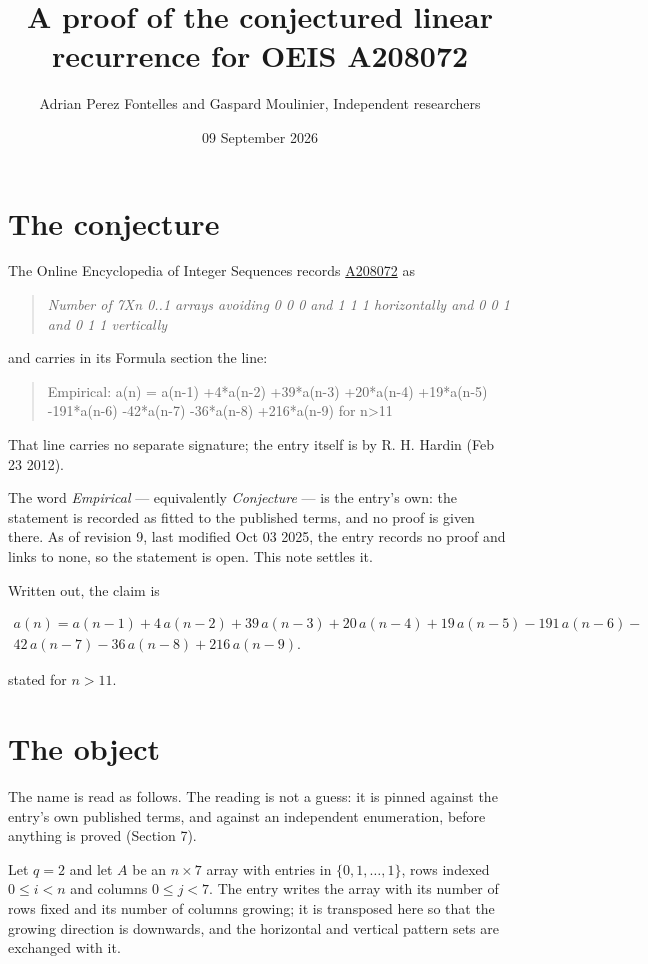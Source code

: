 \documentclass[11pt]{article}
\title{A proof of the conjectured linear recurrence for OEIS A208072}
\author{Adrian Perez Fontelles and Gaspard Moulinier, Independent researchers}
\date{09 September 2026}
\theoremstyle{definition}
\begin{document}
\maketitle
\section{The conjecture}

The Online Encyclopedia of Integer Sequences records \href{https://oeis.org/A208072}{A208072} as

\begin{quote}\itshape Number of 7Xn 0..1 arrays avoiding 0 0 0 and 1 1 1 horizontally and 0 0 1 and 0 1 1 vertically\end{quote}

and carries in its Formula section the line:

\begin{quote}\ttfamily Empirical: a(n) = a(n-1) +4*a(n-2) +39*a(n-3) +20*a(n-4) +19*a(n-5) -191*a(n-6) -42*a(n-7) -36*a(n-8) +216*a(n-9) for n>11\end{quote}

That line carries no separate signature; the entry itself is by R. H. Hardin (Feb 23 2012).

The word {\itshape Empirical} --- equivalently {\itshape Conjecture} --- is the entry's own: the statement is recorded as fitted to the published terms, and no proof is given there. As of revision 9, last modified Oct 03 2025, the entry records no proof and links to none, so the statement is open. This note settles it.

Written out, the claim is

\begin{multline*} a(n) = a(n-1) + 4\,a(n-2) + 39\,a(n-3) + 20\,a(n-4) + 19\,a(n-5) - 191\,a(n-6) - \\ 42\,a(n-7) - 36\,a(n-8) + 216\,a(n-9). \end{multline*}

stated for $n > 11$.

\section{The object}

The name is read as follows. The reading is not a guess: it is pinned against the entry's own published terms, and against an independent enumeration, before anything is proved (Section 7).

Let $q = 2$ and let $A$ be an $n \times 7$ array with entries in $\{0,1,\dots,1\}$, rows indexed $0 \le i < n$ and columns $0 \le j < 7$. The entry writes the array with its number of rows fixed and its number of columns growing; it is transposed here so that the growing direction is downwards, and the horizontal and vertical pattern sets are exchanged with it.
\end{document}
